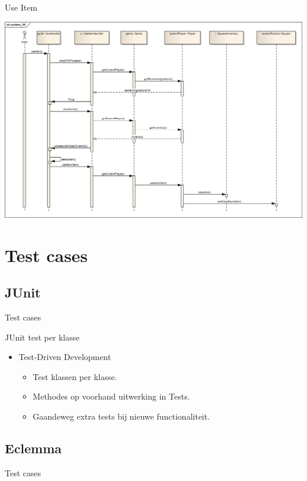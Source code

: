 \documentclass[t]{beamer}
\begin{document}
\begin{frame}[plain]{Use Item}
\begin{center}
\includegraphics[width= 1\linewidth]{../uml/useItem_SD.png}
\end{center}
\end{frame}

\section{Test cases}
\subsection{JUnit}
\begin{frame}{Test cases}
\begin{multicols}{2}
\tableofcontents[currentsection]
\end{multicols}
\end{frame}

\begin{frame}{JUnit test per klasse}
\begin{itemize}
	\item Test-Driven Development
	\begin{itemize}
		\item	Test klassen per klasse.
		\item	Methodes op voorhand uitwerking in Tests.
		\item	Gaandeweg extra tests bij nieuwe functionaliteit.
	\end{itemize}
\end{itemize}
\end{frame}

\subsection{Eclemma}
\begin{frame}{Test cases}
\begin{multicols}{2}
\tableofcontents[currentsection]
\end{multicols}
\end{frame}
\end{document}
